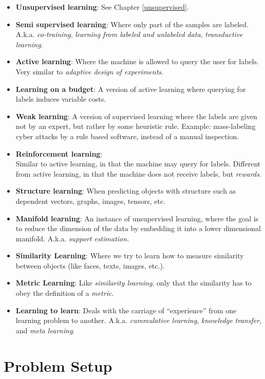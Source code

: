 \documentclass[]{book}
\theoremstyle{definition}
\theoremstyle{definition}
\theoremstyle{definition}
\theoremstyle{remark}
\begin{document}
\begin{itemize}
\item
  \textbf{Unsupervised learning}: See Chapter \ref{unsupervised}.
\item
  \textbf{Semi supervised learning}: Where only part of the samples are
  labeled. A.k.a. \emph{co-training}, \emph{learning from labeled and
  unlabeled data}, \emph{transductive learning}.
\item
  \textbf{Active learning}: Where the machine is allowed to query the
  user for labels. Very similar to \emph{adaptive design of
  experiments}.
\item
  \textbf{Learning on a budget}: A version of active learning where
  querying for labels induces variable costs.
\item
  \textbf{Weak learning}: A version of supervised learning where the
  labels are given not by an expert, but rather by some heuristic rule.
  Example: mass-labeling cyber attacks by a rule based software, instead
  of a manual inspection.
\item
  \textbf{Reinforcement learning}:\\
  Similar to active learning, in that the machine may query for labels.
  Different from active learning, in that the machine does not receive
  labels, but \emph{rewards}.
\item
  \textbf{Structure learning}: When predicting objects with structure
  such as dependent vectors, graphs, images, tensors, etc.
\item
  \textbf{Manifold learning}: An instance of unsupervised learning,
  where the goal is to reduce the dimension of the data by embedding it
  into a lower dimensional manifold. A.k.a. \emph{support estimation}.
\item
  \textbf{Similarity Learning}: Where we try to learn how to measure
  similarity between objects (like faces, texts, images, etc.).
\item
  \textbf{Metric Learning}: Like \emph{similarity learning}, only that
  the similarity has to obey the definition of a \emph{metric}.
\item
  \textbf{Learning to learn}: Deals with the carriage of ``experience''
  from one learning problem to another. A.k.a. \emph{cummulative
  learning}, \emph{knowledge transfer}, and \emph{meta learning}.
\end{itemize}

\section{Problem Setup}\label{problem-setup-3}
\end{document}
